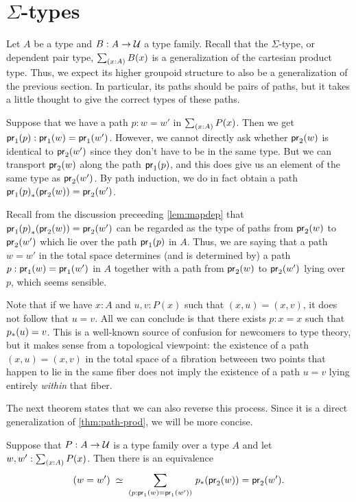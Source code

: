 \section{\texorpdfstring{$\Sigma$}{Σ}-types}
\label{sec:compute-sigma}

Let $A$ be a type and $B:A\to\mathcal{U}$ a type family.
Recall that the $\Sigma$-type, or dependent pair type, $\sm{x:A} B(x)$ is a generalization of the cartesian product type.
Thus, we expect its higher groupoid structure to also be a generalization of the previous section.
In particular, its paths should be pairs of paths, but it takes a little thought to give the correct types of these paths.

Suppose that we have a path $p:w=w'$ in $\sm{x:A}P(x)$.
Then we get ${\mathsf{pr}_{1}}\mathopen{}\left({p}\right)\mathclose{}:\mathsf{pr}_{1}(w)=\mathsf{pr}_{1}(w')$.
However, we cannot directly ask whether $\mathsf{pr}_{2}(w)$ is identical to $\mathsf{pr}_{2}(w')$ since they don't have to be in the same type.
But we can transport $\mathsf{pr}_{2}(w)$ along the path ${\mathsf{pr}_{1}}\mathopen{}\left({p}\right)\mathclose{}$, and this does give us an element of the same type as $\mathsf{pr}_{2}(w')$.
By path induction, we do in fact obtain a path ${{\mathsf{pr}_{1}}\mathopen{}\left({p}\right)\mathclose{}}_{*}\mathopen{}\left({\mathsf{pr}_{2}(w)}\right)\mathclose{}=\mathsf{pr}_{2}(w')$.

Recall from the discussion preceeding \autoref{lem:mapdep} that ${{\mathsf{pr}_{1}}\mathopen{}\left({p}\right)\mathclose{}}_{*}\mathopen{}\left({\mathsf{pr}_{2}(w)}\right)\mathclose{}=\mathsf{pr}_{2}(w')$ can be regarded as the type of paths from $\mathsf{pr}_{2}(w)$ to $\mathsf{pr}_{2}(w')$ which lie over the path ${\mathsf{pr}_{1}}\mathopen{}\left({p}\right)\mathclose{}$ in $A$.
Thus, we are saying that a path $w=w'$ in the total space determines (and is determined by) a path $p:\mathsf{pr}_{1}(w)=\mathsf{pr}_{1}(w')$ in $A$ together with a path from $\mathsf{pr}_{2}(w)$ to $\mathsf{pr}_{2}(w')$ lying over $p$, which seems sensible.

\begin{rmk}
  Note that if we have $x:A$ and $u,v:P(x)$ such that $(x,u)=(x,v)$, it does not follow that $u=v$.
  All we can conclude is that there exists $p:x=x$ such that ${p}_{*}\mathopen{}\left({u}\right)\mathclose{} = v$.
  This is a well-known source of confusion for newcomers to type theory, but it makes sense from a topological viewpoint: the existence of a path $(x,u)=(x,v)$ in the total space of a fibration betweeen two points that happen to lie in the same fiber does not imply the existence of a path $u=v$ lying entirely \emph{within} that fiber.
\end{rmk}

The next theorem states that we can also reverse this process.
Since it is a direct generalization of \autoref{thm:path-prod}, we will be more concise.

\begin{thm}\label{thm:path-sigma}
Suppose that $P:A\to\mathcal{U}$ is a type family over a type $A$ and let $w,w^\prime:\sm{x:A}P(x)$. Then there is an equivalence
\begin{equation*}
\eqvspaced{(w=w')}{\dsm{p:\proj{1}(w)=\proj{1}(w')} \trans{p}{\proj{2}(w)}=\proj{2}(w^\prime)}.
\end{equation*}
\end{thm}


